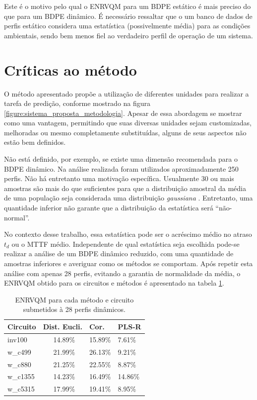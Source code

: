 Este é o motivo pelo qual o ENRVQM para um BDPE estático é mais preciso do que para um BDPE dinâmico. É necessário ressaltar que o um banco de dados de perfis estático considera uma estatística (possivelmente média) para as condições ambientais, sendo bem menos fiel ao verdadeiro perfil de operação de um sistema.

\section{Críticas ao método}
O método apresentado propõe a utilização de diferentes unidades para realizar a tarefa de predição, conforme mostrado na figura \ref{figure:sistema_proposta_metodologia}. Apesar de essa abordagem se mostrar como uma vantagem, permitindo que suas diversas unidades sejam customizadas, melhoradas ou mesmo completamente substituídas, alguns de seus aspectos não estão bem definidos.

Não está definido, por exemplo, se existe uma dimensão recomendada para o BDPE dinâmico. Na análise realizada foram utilizados aproximadamente 250 perfis. Não há entretanto uma motivação específica. Usualmente 30 ou mais amostras são mais do que suficientes para que a distribuição amostral da média de uma população seja considerada uma distribuição \textit{gaussiana} \cite{Montgomery2011}. Entretanto, uma quantidade inferior não garante que a distribuição da estatística será ``não-normal''.

No contexto desse trabalho, essa estatística pode ser o acréscimo médio no atraso $t_d$ ou o MTTF médio. Independente de qual estatística seja escolhida pode-se realizar a análise de um BDPE dinâmico reduzido, com uma quantidade de amostras inferiores e averiguar como os métodos se comportam. Após repetir esta análise com apenas 28 perfis, evitando a garantia de normalidade da média, o ENRVQM obtido para os circuitos e métodos é apresentado na tabela \ref{tb:ENRVQM_reduzido}.

\begin{table}[H]
	\centering
	\caption{ENRVQM para cada método e circuito submetidos à 28 perfis dinâmicos.}
	\begin{tabular}{@{}l|l|l|l@{}}
		\toprule
		Circuito & Dist. Eucli. & Cor. & PLS-R \\ \midrule
		inv100 & \ \ \ 14.89\% & 15.89\% & 7.61\% \\
		w\_c499 & \ \ \ 21.99\% & 26.13\% & 9.21\% \\
		w\_c880 &  \ \ \ 21.25\% & 22.55\% & 8.87\% \\
		w\_c1355 & \ \ \ 14.23\% & 16.49\% & 14.86\% \\
		w\_c5315 & \ \ \ 17.99\% & 19.41\% & 8.95\% \\
		\bottomrule
	\end{tabular}
	\label{tb:ENRVQM_reduzido}
\end{table}

